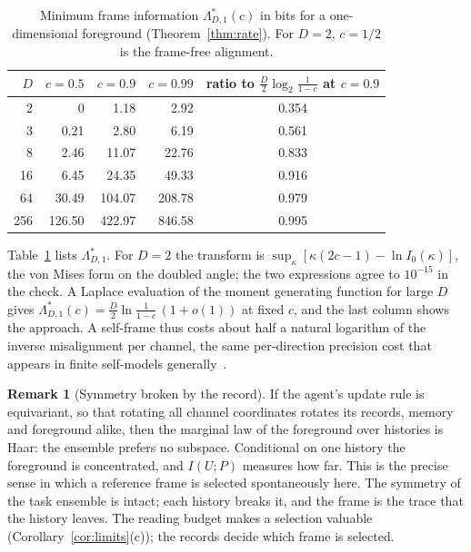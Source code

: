 \documentclass[12pt]{article}
\theoremstyle{definition}
\newtheorem{remark}[theorem]{Remark}
\begin{document}
\begin{table}[t]
\centering
\small
\begin{tabular}{rrrrc}
\toprule
$D$ & $c=0.5$ & $c=0.9$ & $c=0.99$ & ratio to $\tfrac D2\log_2\frac1{1-c}$ at $c=0.9$\\
\midrule
2 & 0 & 1.18 & 2.92 & 0.354 \\
3 & 0.21 & 2.80 & 6.19 & 0.561 \\
8 & 2.46 & 11.07 & 22.76 & 0.833 \\
16 & 6.45 & 24.35 & 49.33 & 0.916 \\
64 & 30.49 & 104.07 & 208.78 & 0.979 \\
256 & 126.50 & 422.97 & 846.58 & 0.995 \\
\bottomrule
\end{tabular}
\caption{Minimum frame information $\Lambda^*_{D,1}(c)$ in bits for a one-dimensional foreground (Theorem~\ref{thm:rate}). For $D=2$, $c=1/2$ is the frame-free alignment.}
\label{tab:rate}
\end{table}

Table~\ref{tab:rate} lists $\Lambda^*_{D,1}$. For $D=2$ the transform is $\sup_\kappa[\kappa(2c-1)-\ln I_0(\kappa)]$, the von Mises form on the doubled angle; the two expressions agree to $10^{-15}$ in the check. A Laplace evaluation of the moment generating function for large $D$ gives $\Lambda^*_{D,1}(c)=\tfrac D2\ln\frac1{1-c}\,(1+o(1))$ at fixed $c$, and the last column shows the approach. A self-frame thus costs about half a natural logarithm of the inverse misalignment per channel, the same per-direction precision cost that appears in finite self-models generally~\cite{Liu2026CIII}.

\begin{remark}[Symmetry broken by the record]
\label{rem:history}
If the agent's update rule is equivariant, so that rotating all channel coordinates rotates its records, memory and foreground alike, then the marginal law of the foreground over histories is Haar: the ensemble prefers no subspace. Conditional on one history the foreground is concentrated, and $I(U;P)$ measures how far. This is the precise sense in which a reference frame is selected spontaneously here. The symmetry of the task ensemble is intact; each history breaks it, and the frame is the trace that the history leaves. The reading budget makes a selection valuable (Corollary~\ref{cor:limits}(c)); the records decide which frame is selected.
\end{remark}
\end{document}
